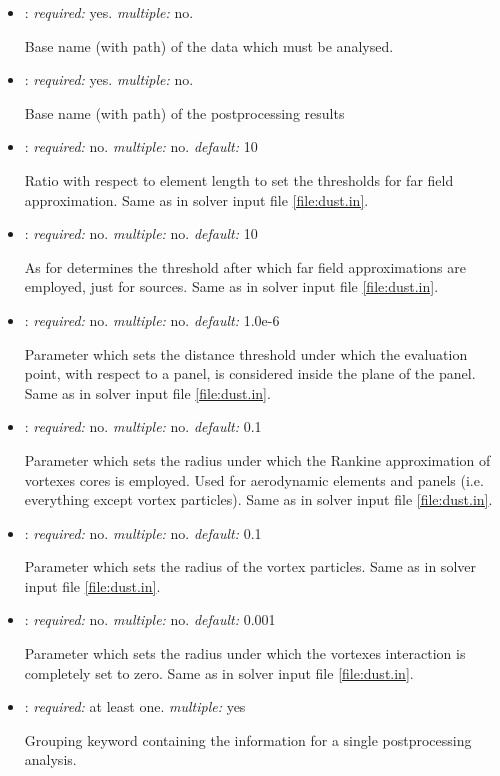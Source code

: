 \begin{itemize}
\item {}: \textit{required:} yes. \textit{multiple:} no. 

Base name (with path) of the data which must be analysed.

\item {}: \textit{required:} yes. \textit{multiple:} no. 

Base name (with path) of the postprocessing results

\item {}: \textit{required:} no. 
\textit{multiple:} no. \textit{default:} 10

Ratio with respect to element length to set the thresholds for far field approximation. 
Same as in solver input file \ref{file:dust.in}.

\item {}: \textit{required:} no. \textit{multiple:} no. 
\textit{default:} 10

As for  determines the threshold after which 
far field approximations are employed, just for sources. Same as in solver 
input file \ref{file:dust.in}.

\item {}: \textit{required:} no. \textit{multiple:} no. 
\textit{default:} 1.0e-6

Parameter which sets the distance threshold under which the evaluation point, 
with respect to a panel, is considered inside the plane of the panel. 
Same as in solver input file \ref{file:dust.in}.

\item {}: \textit{required:} no. \textit{multiple:} no. 
\textit{default:} 0.1

Parameter which sets the radius under which the Rankine approximation of 
vortexes cores is employed. Used for aerodynamic elements and panels 
(i.e. everything except vortex particles). Same as in solver input file \ref{file:dust.in}.

\item {}: \textit{required:} no. \textit{multiple:} no. 
\textit{default:} 0.1

Parameter which sets the radius of the vortex particles. Same as in solver 
input file \ref{file:dust.in}.

\item {}: \textit{required:} no. \textit{multiple:} no. 
\textit{default:} 0.001

Parameter which sets the radius under which the vortexes interaction is 
completely set to zero. Same as in solver input file \ref{file:dust.in}.

\item {}: \textit{required:} at least one. \textit{multiple:} yes

Grouping keyword containing the information for a single postprocessing analysis.

\end{itemize}

